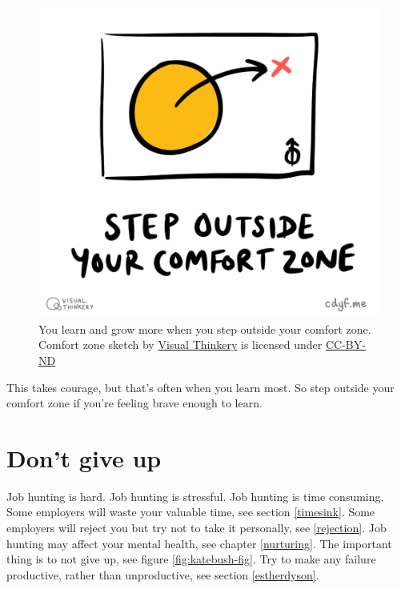 \documentclass[
]{book}
\begin{document}
\begin{figure}

{\centering \includegraphics[width=0.5\linewidth]{images/Step outside your comfort zone} 

}

\caption{You learn and grow more when you step outside your comfort zone. Comfort zone sketch by \href{https://visualthinkery.com}{Visual Thinkery} is licensed under \href{https://creativecommons.org/licenses/by-nd/4.0/}{CC-BY-ND}}\label{fig:comfortzone-fig}
\end{figure}



This takes courage, but that's often when you learn most. So step outside your comfort zone if you're feeling brave enough to learn.

\hypertarget{nevergiveup}{%
\section{Don't give up}\label{nevergiveup}}

Job hunting is hard. Job hunting is stressful. Job hunting is time consuming. Some employers will waste your valuable time, see section \ref{timesink}. Some employers will reject you but try not to take it personally, see \ref{rejection}. Job hunting may affect your mental health, see chapter \ref{nurturing}. The important thing is to not give up, see figure \ref{fig:katebush-fig}. Try to make any failure productive, rather than unproductive, see section \ref{estherdyson}.
\end{document}
